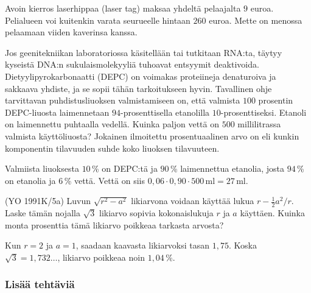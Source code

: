 \begin{tehtavasivu}
\begin{tehtava}
	Avoin kierros laserhippaa (laser tag) maksaa yhdeltä pelaajalta $9$ euroa. Pelialueen voi kuitenkin varata seurueelle hintaan $260$ euroa. Mette on menossa pelaamaan viiden kaverinsa kanssa. 
	\begin{vastaus}
	\end{vastaus}
\end{tehtava}

\begin{tehtava}
Jos geenitekniikan laboratoriossa käsitellään tai tutkitaan RNA:ta, täytyy kyseistä DNA:n sukulaismolekyyliä tuhoavat entsyymit deaktivoida. Dietyylipyrokarbonaatti (DEPC) on voimakas proteiineja denaturoiva ja sakkaava yhdiste, ja se sopii tähän tarkoitukseen hyvin. Tavallinen ohje tarvittavan puhdistusliuoksen valmistamiseen on, että valmista $100$ prosentin DEPC-liuosta laimennetaan $94$-prosenttisella etanolilla $10$-prosenttiseksi. Etanoli on laimennettu puhtaalla vedellä. Kuinka paljon vettä on $500$ millilitrassa valmista käyttöliuosta? Jokainen ilmoitettu prosentuaalinen arvo on  eli kunkin komponentin tilavuuden suhde koko liuoksen tilavuuteen.
	\begin{vastaus}
	Valmiista liuoksesta $10\,$\% on DEPC:tä ja $90\,$\% laimennettua etanolia, josta $94\,$\% on etanolia ja $6$\,\% vettä. Vettä on siis $0,06\cdot0,90\cdot500$\,ml$=27$\,ml.
	\end{vastaus}
\end{tehtava}

\begin{tehtava}
    (YO 1991K/5a) Luvun $\sqrt{r^2-a^2}$ likiarvona voidaan käyttää lukua $r-{\frac{1}{2}a^2}/r$. Laske tämän nojalla $\sqrt{3}$ likiarvo sopivia kokonaislukuja $r$ ja $a$ käyttäen. Kuinka monta prosenttia tämä likiarvo poikkeaa tarkasta arvosta?
    \begin{vastaus}
    Kun $r=2$ ja $a=1$, saadaan kaavasta likiarvoksi tasan $1,75$. Koska $\sqrt{3}=1,732\ldots$, likiarvo poikkeaa noin $1,04\,\%$.
    \end{vastaus}
\end{tehtava}

\subsubsection*{Lisää tehtäviä}


\end{tehtavasivu}
